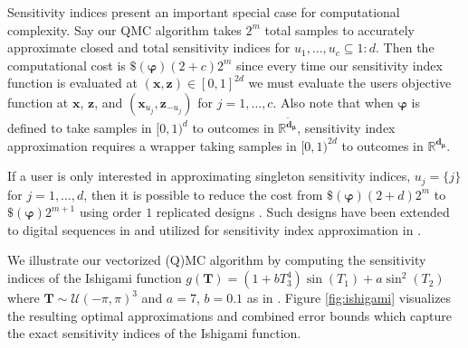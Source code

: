 \documentclass[graybox]{svmult}
\begin{document}
Sensitivity indices present an important special case for computational complexity. Say our QMC algorithm takes $2^m$ total samples to accurately approximate closed and total sensitivity indices for $u_1,\dots,u_c \subseteq 1:d$. Then the computational cost is $\$(\boldsymbol{\varphi})(2+c)2^m$ since every time our sensitivity index function is evaluated at $(\boldsymbol{x},\boldsymbol{z}) \in [0,1]^{2d}$ we must evaluate the users objective function at $\boldsymbol{x}$, $\boldsymbol{z}$, and $(\boldsymbol{x}_{u_j},\boldsymbol{z}_{-{u_j}})$ for $j=1,\dots,c$. Also note that when $\boldsymbol{\varphi}$ is defined to take samples in  $[0,1)^{d}$ to outcomes in $\mathbb{R}^{\tilde{\boldsymbol{d}}_{\boldsymbol{\mu}}}$, sensitivity index approximation requires a wrapper taking samples in $[0,1)^{2d}$ to outcomes in $\mathbb{R}^{\boldsymbol{d}_{\boldsymbol{\mu}}}$.

If a user is only interested in approximating singleton sensitivity indices, $u_j = \{j\}$ for $j=1,\dots,d$, then it is possible to reduce the cost from $\$(\boldsymbol{\varphi})(2+d)2^m$ to $\$(\boldsymbol{\varphi})2^{m+1}$ using order $1$ replicated designs \cite{alex2008comparison,tissot2015randomized}. Such designs have been extended to  digital sequences in \cite{replicated_designs_sobol_seq} and utilized for sensitivity index approximation in \cite{reliable_sobol_indices_approx}.

We illustrate our vectorized (Q)MC algorithm by computing the sensitivity indices of the  Ishigami function \cite{ishigami1990importance} $g(\boldsymbol{T}) = (1+bT_3^4)\sin(T_1)+a\sin^2(T_2)$ where $\boldsymbol{T} \sim \mathcal{U}(-\pi,\pi)^3$ and $a=7$, $b=0.1$ as in \cite{crestaux2007polynomial,marrel2009calculations}. Figure \ref{fig:ishigami} visualizes the resulting optimal approximations and combined error bounds which capture the exact sensitivity indices of the Ishigami function. 
\end{document}
